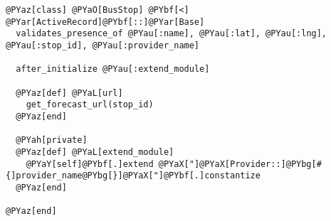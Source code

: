 \begin{Verbatim}[commandchars=@\[\]]
@PYaz[class] @PYaO[BusStop] @PYbf[<] @PYar[ActiveRecord]@PYbf[::]@PYar[Base]
  validates_presence_of @PYau[:name], @PYau[:lat], @PYau[:lng], @PYau[:stop_id], @PYau[:provider_name]

  after_initialize @PYau[:extend_module]
  
  @PYaz[def] @PYaL[url]
    get_forecast_url(stop_id)
  @PYaz[end]
  
  @PYah[private]
  @PYaz[def] @PYaL[extend_module]
    @PYaY[self]@PYbf[.]extend @PYaX["]@PYaX[Provider::]@PYbg[#{]provider_name@PYbg[}]@PYaX["]@PYbf[.]constantize
  @PYaz[end]
  
@PYaz[end]
\end{Verbatim}
